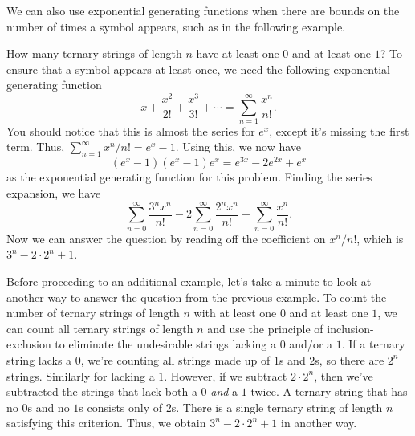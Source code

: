 We can also use exponential generating functions when there are bounds
on the number of times a symbol appears, such as in the following
example.

\begin{example}
  How many ternary strings of length $n$ have at least one $0$ and at
  least one $1$?  To ensure that a symbol appears at least once, we
  need the following exponential generating function
  \[x+\frac{x^2}{2!} + \frac{x^3}{3!} + \cdots = \sum_{n=1}^\infty
  \frac{x^n}{n!}.\] You should notice that this is almost the series
  for $e^x$, except it's missing the first term. Thus,
  $\sum_{n=1}^\infty x^n/n! = e^x-1$. Using this, we now have 
  \[(e^x-1)(e^x-1)e^x=e^{3x}-2e^{2x}+e^x\] as the exponential
  generating function for this problem.  Finding the series expansion,
  we have
  \[\sum_{n=0}^\infty \frac{3^nx^n}{n!} - 2\sum_{n=0}^\infty
  \frac{2^nx^n}{n!} + \sum_{n=0}^\infty \frac{x^n}{n!}.\]
  Now we can answer the question by reading off the coefficient on
  $x^n/n!$, which is $3^n - 2\cdot 2^n + 1$.
\end{example}

Before proceeding to an additional example, let's take a minute to
look at another way to answer the question from the previous
example. To count the number of ternary strings of length $n$ with at
least one $0$ and at least one $1$, we can count all ternary strings
of length $n$ and use the principle of inclusion-exclusion to
eliminate the undesirable strings lacking a $0$ and/or a $1$. If a
ternary string lacks a $0$, we're counting all strings made up of $1$s
and $2$s, so there are $2^n$ strings. Similarly for lacking a
$1$. However, if we subtract $2\cdot 2^n$, then we've subtracted the
strings that lack both a $0$ \emph{and} a $1$ twice. A ternary string
that has no $0$s and no $1$s consists only of $2$s. There is a single
ternary string of length $n$ satisfying this criterion. Thus, we
obtain $3^n-2\cdot 2^n+1$ in another way.

